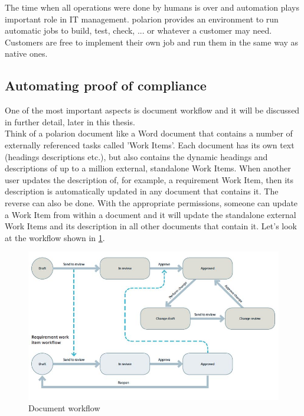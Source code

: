 \documentclass[thesis=M,english]{FITthesis}[2012/06/26]
\begin{document}
The time when all operations were done by humans is over and automation plays important role in IT management. \acrshort{polarion} provides an environment to run automatic jobs to build, test, check, ... or whatever a customer may need. Customers are free to implement their own job and run them in the same way as native ones.

\subsection{Automating proof of compliance}

One of the most important aspects is document workflow and it will be discussed in further detail, later in this thesis.\\ 

Think of a \acrshort{polarion} document like a Word document that contains a number of externally referenced tasks called 'Work Items'. Each document has its own text (headings descriptions etc.), but also contains the dynamic headings and descriptions of up to a million external, standalone Work Items. When another user updates the description of, for example, a requirement Work Item, then its description is automatically updated in any document that contains it. The reverse can also be done. With the appropriate permissions, someone can update a Work Item from within a document and it will update the standalone external Work Items and its description in all other documents that contain it. Let's look at the workflow shown in \ref{fig:document_workflow}.

\begin{figure}[h!]\centering
	\includegraphics[width=1\textwidth]{pictures/document_workflow}
	\caption{Document workflow \cite{polarion_alm}}\label{fig:document_workflow}
\end{figure}
\end{document}
